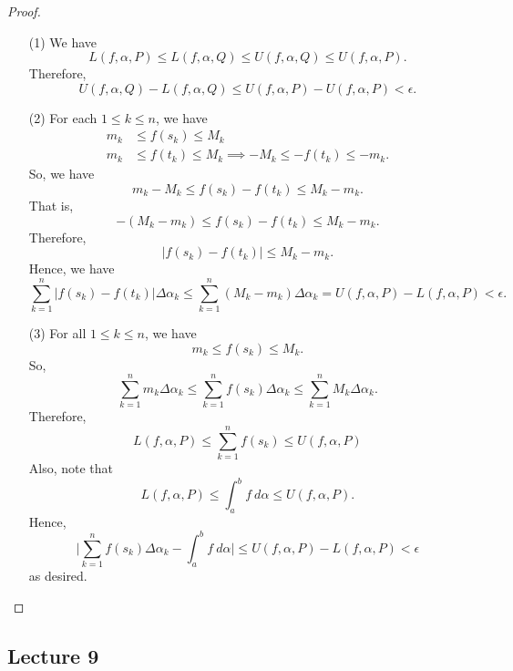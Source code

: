\begin{proof}
\begin{enumerate}
    \item[(1)] We have 
        \[  L(f,\alpha, P) \leq L(f,\alpha, Q ) \leq U(f,\alpha, Q) \leq U(f,\alpha, P). \]
        Therefore, 
        \[  U(f,\alpha, Q ) - L(f,\alpha,Q) \leq U(f,\alpha, P) - U(f,\alpha, P) < \epsilon. \]
    \item[(2)] For each \( 1 \leq k \leq n  \), we have 
        \begin{align*}
            {m}_{k } &\leq f({s}_{k}) \leq {M}_{k} \\
            {m}_{k}&\leq f({t}_{k}) \leq {M}_{k} \implies - {M}_{k } \leq - f({t}_{k}) \leq - {m}_{k}.
        \end{align*}
        So, we have 
        \[  {m}_{k } - {M}_{k } \leq f({s}_{k}) - f({t}_{k}) \leq {M}_{k } - {m}_{k}. \]
        That is, 
        \[  - ({M}_{k } - {m}_{k}) \leq f({s}_{k}) - f({t}_{k}) \leq {M}_{k } - {m}_{k}. \]
        Therefore, 
        \[  | f({s}_{k}) - f({t}_{k})  | \leq {M}_{k } - {m}_{k}. \]
        Hence, we have 
        \[ \sum_{ k=1  }^{ n } | f({s}_{k}) - f({t}_{k}) |  \Delta {\alpha}_{k } \leq \sum_{ k=1  }^{ n } ({M}_{k } - {m}_{k}) \Delta {\alpha}_{k } = U(f,\alpha, P) - L(f,\alpha,P) < \epsilon. \]
    \item[(3)] For all \( 1 \leq k \leq n  \), we have 
        \[  {m}_{k } \leq f({s}_{k}) \leq {M}_{k }. \]
        So, 
        \[  \sum_{ k=1  }^{ n } {m}_{k } \Delta {\alpha}_{k } \leq \sum_{ k=1  }^{ n } f({s}_{k}) \Delta {\alpha}_{k } \leq \sum_{ k=1  }^{ n } {M}_{k } \Delta {\alpha}_{k }. \]
        Therefore, 
        \[  L(f,\alpha, P) \leq \sum_{ k=1  }^{ n } f({s}_{k}) \leq U(f,\alpha,P) \tag{I} \]
        Also, note that 
        \[  L(f,\alpha,P) \leq \int_{ a }^{ b }  f  \ d \alpha \leq U(f,\alpha, P). \tag{II} \]
        Hence,
        \[  \Big| \sum_{ k=1  }^{ n } f({s}_{k}) \Delta {\alpha}_{k } - \int_{ a }^{ b }  f \ d \alpha \Big|  \leq U(f,\alpha, P) - L(f,\alpha, P) < \epsilon \]
        as desired.
\end{enumerate}
\end{proof}







\subsection{Lecture 9}

